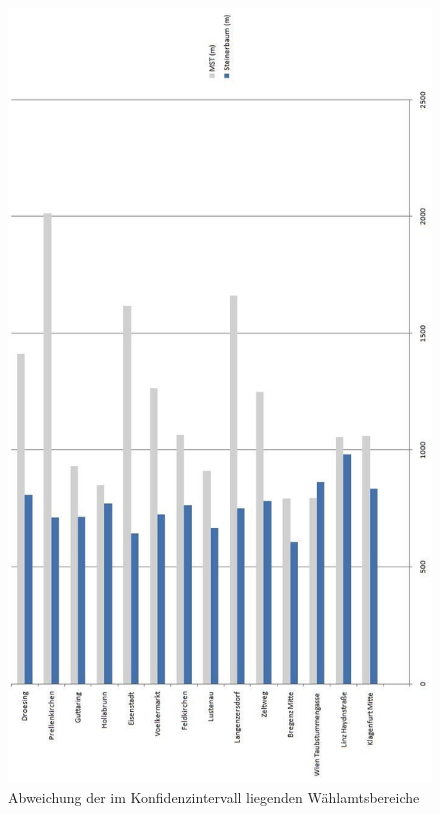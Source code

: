 \begin{figure}[H]
    \centerline{\includegraphics[scale=0.7]{pics/final_final}}
    \caption[Abweichung in gültigen Wahlamtsbereichen]{\label{FiG:Abweichung in gültigen Wahlamtsbereichen}
     Abweichung der im Konfidenzintervall liegenden Wählamtsbereiche}
\end{figure}

